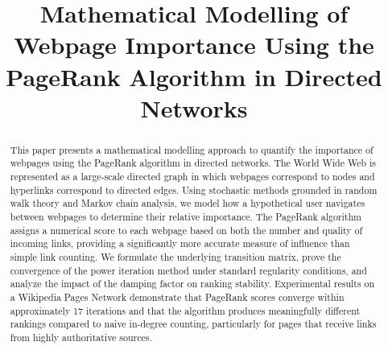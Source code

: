 \documentclass[conference]{IEEEtran}
\begin{document}
\title{Mathematical Modelling of Webpage Importance Using the PageRank Algorithm in Directed Networks}

\author{
\and
{}
\and
{}
\and
\IEEEauthorblockN{~}
\IEEEauthorblockA{~}
\and
{}
}

\maketitle

\begin{abstract}
This paper presents a mathematical modelling approach to quantify the importance of webpages using the PageRank algorithm in directed networks. The World Wide Web is represented as a large-scale directed graph in which webpages correspond to nodes and hyperlinks correspond to directed edges. Using stochastic methods grounded in random walk theory and Markov chain analysis, we model how a hypothetical user navigates between webpages to determine their relative importance. The PageRank algorithm assigns a numerical score to each webpage based on both the number and quality of incoming links, providing a significantly more accurate measure of influence than simple link counting. We formulate the underlying transition matrix, prove the convergence of the power iteration method under standard regularity conditions, and analyze the impact of the damping factor on ranking stability. Experimental results on a Wikipedia Pages Network demonstrate that PageRank scores converge within approximately 17 iterations and that the algorithm produces meaningfully different rankings compared to naive in-degree counting, particularly for pages that receive links from highly authoritative sources.
\end{abstract}
\end{document}
